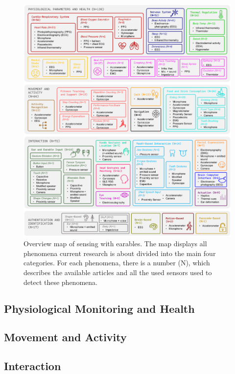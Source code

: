 \begin{figure}[t]
    \centering
    \includegraphics[scale=0.3525]{thesis-doc/images/sensing_with_earables_overview.png}
    \caption{Overview map of sensing with earables. The map displays all phenomena current research is about divided into the main four categories. For each phenomena, there is a number (N), which describes the available articles and all the used sensors used to detect these phenomena.}
    \label{fig:sensing_with_earables_overview}
\end{figure}

\subsection{Physiological Monitoring and Health}
\label{Background:SensingWithEarables:Physiological}

\subsection{Movement and Activity}
\label{Background:SensingWithEarables:Movement}

\subsection{Interaction}
\label{Background:SensingWithEarables:Interaction}

